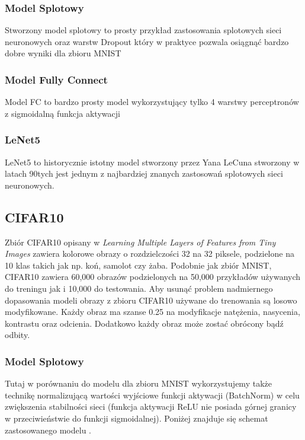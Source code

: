 \documentclass{article}
\begin{document}
        \subsubsection{Model Splotowy}
        Stworzony model splotowy to prosty przykład zastosowania splotowych sieci neuronowych oraz warstw Dropout
        który w praktyce pozwala osiągnąć bardzo dobre wyniki dla zbioru MNIST

        \subsubsection{Model Fully Connect}
        Model FC to bardzo prosty model wykorzystujący tylko 4 warstwy perceptronów z sigmoidalną funkcja aktywacji 

        \subsubsection{LeNet5}
        LeNet5 to historycznie istotny model stworzony przez Yana LeCuna stworzony w latach 90tych
        jest jednym z najbardziej znanych zastosowań splotowych sieci neuronowych. 

    \subsection{CIFAR10}
    Zbiór CIFAR10 opisany w \textit{Learning Multiple Layers of Features from Tiny Images} \cite{Krizhevsky2009LearningML} zawiera kolorowe obrazy o rozdzielczości 32 na 32 piksele,
    podzielone na 10 klas takich jak np. koń, samolot czy żaba. Podobnie jak zbiór MNIST, CIFAR10 zawiera
    60,000 obrazów podzielonych na 50,000 przykładów używanych do treningu jak i 10,000 do testowania.
    Aby usunąć problem nadmiernego dopasowania modeli obrazy z zbioru CIFAR10 używane
    do trenowania są losowo modyfikowane. Każdy obraz ma szanse 0.25  na
    modyfikacje natężenia, nasycenia, kontrastu oraz odcienia. Dodatkowo każdy obraz może zostać obrócony bądź odbity.

        \subsubsection{Model Splotowy}
        Tutaj w porównaniu do modelu dla zbioru MNIST wykorzystujemy także technikę normalizującą wartości wyjściowe
        funkcji aktywacji (BatchNorm) w celu zwiększenia stabilności sieci (funkcja aktywacji ReLU nie posiada górnej granicy w
        przeciwieństwie do funkcji sigmoidalnej). Poniżej znajduje się schemat zastosowanego modelu .
\end{document}
